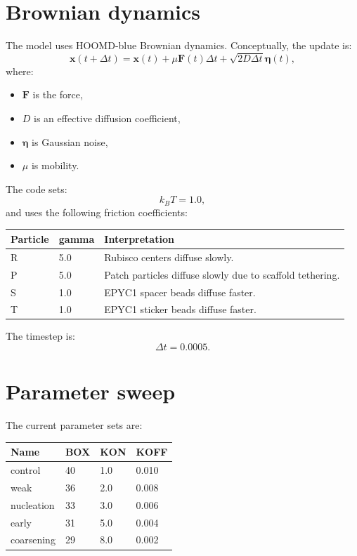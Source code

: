 \documentclass[11pt]{article}
\begin{document}
\section{Brownian dynamics}

The model uses HOOMD-blue Brownian dynamics. Conceptually, the update is:
\[
\mathbf{x}(t+\Delta t)
=
\mathbf{x}(t)
+
\mu\mathbf{F}(t)\Delta t
+
\sqrt{2D\Delta t}\bm{\eta}(t),
\]
where:
\begin{itemize}
    \item \(\mathbf{F}\) is the force,
    \item \(D\) is an effective diffusion coefficient,
    \item \(\bm{\eta}\) is Gaussian noise,
    \item \(\mu\) is mobility.
\end{itemize}

The code sets:
\[
k_BT = 1.0,
\]
and uses the following friction coefficients:
\begin{longtable}{>{\ttfamily}p{} p{} p{}}
\toprule
Particle & gamma & Interpretation \\
\midrule
R & 5.0 & Rubisco centers diffuse slowly. \\
P & 5.0 & Patch particles diffuse slowly due to scaffold tethering. \\
S & 1.0 & EPYC1 spacer beads diffuse faster. \\
T & 1.0 & EPYC1 sticker beads diffuse faster. \\
\bottomrule
\end{longtable}

The timestep is:
\[
\Delta t = 0.0005.
\]

\section{Parameter sweep}

The current parameter sets are:
\begin{longtable}{>{\ttfamily}p{} p{} p{} p{}}
\toprule
Name & BOX & KON & KOFF \\
\midrule
control & 40 & 1.0 & 0.010 \\
weak & 36 & 2.0 & 0.008 \\
nucleation & 33 & 3.0 & 0.006 \\
early & 31 & 5.0 & 0.004 \\
coarsening & 29 & 8.0 & 0.002 \\
\bottomrule
\end{longtable}
\end{document}
